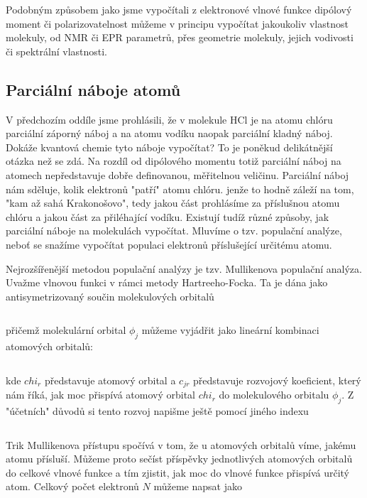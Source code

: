 Podobným způsobem jako jsme vypočítali z elektronové vlnové funkce dipólový moment či polarizovatelnost můžeme v principu vypočítat jakoukoliv vlastnost molekuly, od NMR či EPR parametrů, přes geometrie molekuly, jejich vodivosti či spektrální vlastnosti.  



\subsection{Parciální náboje atomů}

V předchozím oddíle jsme prohlásili, že v molekule HCl je na atomu chlóru parciální záporný náboj a na atomu vodíku naopak parciální kladný náboj. Dokáže kvantová chemie tyto náboje vypočítat? To je poněkud delikátnější otázka než se zdá. Na rozdíl od dipólového momentu totiž parciální náboj na atomech nepředstavuje dobře definovanou, měřitelnou veličinu. Parciální náboj nám sděluje, kolik elektronů "patří" atomu chlóru. jenže to hodně záleží na tom, "kam až sahá Krakonošovo", tedy jakou část prohlásíme za příslušnou atomu chlóru a jakou část za přiléhající vodíku. Existují tudíž různé způsoby, jak parciální náboje na molekulách vypočítat. Mluvíme o tzv. populační analýze, neboť se snažíme vypočítat populaci elektronů příslušející určitému atomu.

Nejrozšířenější metodou populační analýzy je tzv. Mullikenova populační analýza. Uvažme vlnovou funkci v rámci metody Hartreeho-Focka. Ta je dána jako antisymetrizovaný součin molekulových orbitalů

\begin{equation}
\label{rov:XXX}
\end{equation}

\noindent přičemž molekulární orbital $\phi_j$ můžeme vyjádřit jako lineární kombinaci atomových orbitalů:

\begin{equation}
\label{rov:XXX}
\end{equation}

\noindent kde $chi_r$ představuje atomový orbital a $c_{jr}$ představuje rozvojový koeficient, který nám říká, jak moc přispívá atomový orbital $chi_r$ do molekulového orbitalu $\phi_j$. Z "účetních" důvodů si tento rozvoj napišme ještě pomocí jiného indexu

\begin{equation}
\label{rov:XXX}
\end{equation}

Trik Mullikenova přístupu spočívá v tom, že u atomových orbitalů víme, jakému atomu přísluší. Můžeme proto sečíst příspěvky jednotlivých atomových orbitalů do celkové vlnové funkce a tím zjistit, jak moc do vlnové funkce přispívá určitý atom. Celkový počet elektronů $N$ můžeme napsat jako


